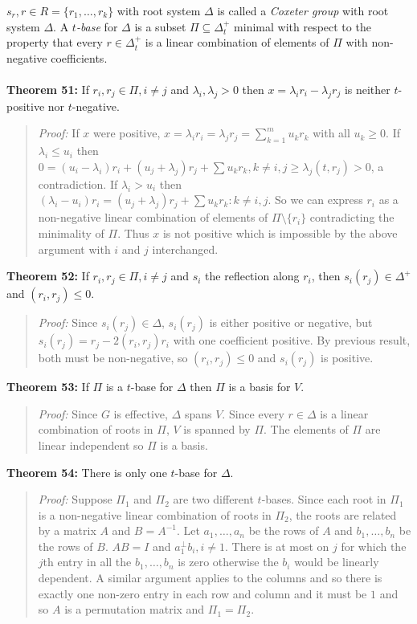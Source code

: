 $s_r, r \in R= \{r_1, \ldots, r_k \}$ with root system $\Delta$ is called a 
\emph{Coxeter group} with root system $\Delta$.
A $t$\emph{-base} for $\Delta$ is a subset $\Pi \subseteq \Delta_t^+$ minimal with respect
to the property that every $r \in \Delta_t^+$ is a linear combination of elements of
$\Pi$ with non-negative coefficients.
\\
\\
{\bf Theorem 51:}
If $r_i, r_j \in \Pi, i \ne j$ and $\lambda_i, \lambda_j >0$ then
$x= \lambda_i r_i - \lambda_j r_j$ is neither $t$-positive nor $t$-negative.
\begin{quote}
\emph{Proof:}  
If $x$ were positive, $x= \lambda_i r_i = \lambda_j r_j = \sum_{k=1}^m u_k r_k$
with all $u_k \ge 0$.  If $\lambda_i \le u_i$ then
$0= (u_i - \lambda_i) r_i + (u_j + \lambda_j) r_j +
\sum u_k r_k, k \ne i,j \ge \lambda_j(t, r_j) >0$, a contradiction.
If $\lambda_i > u_i$ then
$(\lambda_i - u_i) r_i = (u_j + \lambda_j) r_j + \sum u_k r_k: k \ne i, j$.
So we can express $r_i$ as a non-negative linear combination of elements of
$\Pi \setminus \{ r_i \}$ contradicting the minimality of $\Pi$.  Thus $x$
is not positive which is impossible by the above argument with $i$ and $j$ interchanged.
\end{quote}
{\bf Theorem 52:}
If $r_i, r_j \in \Pi, i \ne j$ and $s_i$ the reflection along $r_i$, then $s_i(r_j) \in \Delta^+$
and $(r_i, r_j) \le 0$.
\begin{quote}
\emph{Proof:}  
Since $s_i(r_j) \in \Delta$, 
$s_i(r_j)$ is either positive or negative, but $s_i(r_j)= r_j - 2(r_i, r_j) r_i$ with
one coefficient positive.  By previous result, both must be non-negative, so $(r_i , r_j) \le 0$
and $s_i(r_j)$ is positive.
\end{quote}
{\bf Theorem 53:}
If $\Pi$ is a $t$-base for $\Delta$ then $\Pi$ is a basis for $V$.
\begin{quote}
\emph{Proof:}  
Since $G$ is effective, $\Delta$ spans $V$.  Since every $r \in \Delta$
is a linear combination of roots in $\Pi$, $V$ is spanned by $\Pi$.  The
elements of $\Pi$ are linear independent so $\Pi$ is a basis.
\end{quote}
{\bf Theorem 54:}
There is only one $t$-base for $\Delta$.
\begin{quote}
\emph{Proof:}  
Suppose $\Pi_1$ and $\Pi_2$ are two different $t$-bases.  Since each root in $\Pi_1$
is a non-negative linear combination of roots in $\Pi_2$, the roots are related
by a matrix $A$ and $B= A^{-1}$.  
Let $a_1 , \ldots , a_n$ be the rows of $A$
and $b_1 , \ldots , b_n$ be the rows of $B$.  $AB=I$ and $a_1^{\perp} b_i, i \ne 1$.
There is at most on $j$ for which the $j$th entry in all the
$b_1 , \ldots , b_n$ is zero otherwise the $b_i$ would be linearly dependent.  A similar argument
applies to the columns and so there is exactly one non-zero entry in each row and column and
it must be $1$ and so $A$ is a permutation matrix and $\Pi_1= \Pi_2$.
\end{quote}
